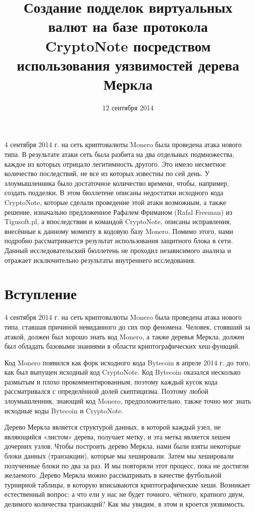 \documentclass{mrl}
\title{Создание подделок виртуальных валют на базе протокола CryptoNote \linebreak посредством использования уязвимостей дерева Меркла}
\date{12 сентября 2014 }
\begin{document}
\begin{center}
{}
\end{center}

4 сентября 2014 г. на сеть криптовалюты Monero была проведена атака нового типа. В результате атаки сеть была разбита на два отдельных подмножества, каждое из которых отрицало легитимность другого. Это имело несметное количество последствий, не все из которых известны по сей день. У злоумышленника было достаточное количество времени, чтобы, например, создать подделки. В этом бюллетене описаны недостатки исходного кода CryptoNote, которые сделали проведение этой атаки возможным, а также решение, изначально предложенное Рафалем Фриманом (Rafal Freeman) из Tigusoft.pl, а впоследствии и командой CryptoNote, описаны исправления, внесённые к данному моменту в кодовую базу Monero. Помимо этого, нами подробно рассматривается результат использования защитного блока в сети. Данный исследовательский бюллетень не проходил независимого анализа и отражает исключительно результаты внутреннего исследования.

\section{Вступление}
4 сентября 2014 г. на сеть криптовалюты Monero была проведена атака нового типа, ставшая причиной невиданного до сих пор феномена. Человек, стоявший за атакой, должен был хорошо знать код Monero, а также деревья Меркла, должен был обладать базовыми знаниями в области криптографических хеш-функций.

Код Monero появился как форк исходного кода Bytecoin в апреле 2014 г. до того, как был выпущен исходный код CryptoNote. Код Bytecoin оказался несколько размытым и плохо прокомментированным, поэтому каждый кусок кода рассматривался с определённой долей скептицизма. Поэтому любой злоумышленник, знающий код Monero, предположительно, также точно мог знать исходные коды Bytecoin и CryptoNote.

Дерево Меркла является структурой данных, в которой каждый узел, не являющийся «листом» дерева, получает метку, и эта метка является хешем дочерних узлов\cite{merkle1988digital}. Чтобы построить дерево Меркла, нами были взяты некоторые блоки данных (транзакции), которые мы хешировали. Затем мы хешировали полученные блоки по два за раз. И мы повторяли этот процесс, пока не достигли желаемого. Дерево Меркла можно рассматривать в качестве футбольной турнирной таблицы, в которую вписываются криптографические хеши. Возникает естественный вопрос: а что ели у нас не будет точного, чётного, кратного двум, делимого количества транзакций? Как мы увидим, в этом и кроется уязвимость.
\end{document}
